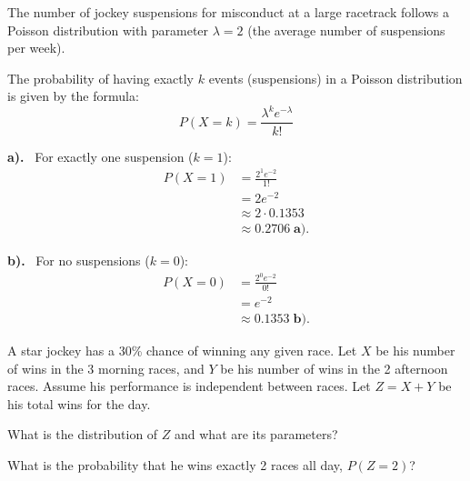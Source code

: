 \documentclass[a4paper, 10pt]{article}
\begin{document}
\begin{solution}
	The number of jockey suspensions for misconduct at a large racetrack follows a Poisson distribution
	with parameter \( \lambda = 2 \) (the average number of suspensions per week).

	The probability of having exactly \( k \) events (suspensions) in a Poisson distribution is given by the formula:
	\[
		P(X = k) = \frac{\lambda^k e^{-\lambda}}{k!}
	\]

	\par\noindent\textbf{a).} \, For exactly one suspension (\( k = 1 \)):
	\begin{align*}
		P(X = 1) & = \frac{2^1 e^{-2}}{1!}                \\
		         & = 2 e^{-2}                             \\
		         & \approx 2 \cdot 0.1353                 \\
		         & \approx \boxed{0.2706} \; \textbf{a).}
	\end{align*}

	\par\noindent\textbf{b).} \, For no suspensions (\( k = 0 \)):
	\begin{align*}
		P(X = 0) & = \frac{2^0 e^{-2}}{0!}                \\
		         & = e^{-2}                               \\
		         & \approx \boxed{0.1353} \; \textbf{b).}
	\end{align*}
\end{solution}

\begin{problem}
A star jockey has a 30\% chance of winning any given race.
Let \( X \) be his number of wins in the 3 morning races, and \( Y \) be his number of wins in the 2 afternoon races.
Assume his performance is independent between races.
Let \( Z = X + Y \) be his total wins for the day.

\begin{subproblems_alpha}
	\item What is the distribution of \( Z \) and what are its parameters?
	\item What is the probability that he wins exactly 2 races all day, \( P(Z = 2) \)?
\end{subproblems_alpha}
\end{problem}
\end{document}
